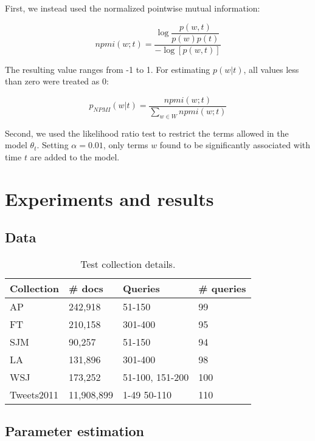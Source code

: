 \documentclass{sig-alternate}
\begin{document}
First, we instead used the normalized pointwise mutual information:

\[
npmi(w;t) = \dfrac{\log \dfrac{p(w,t)}{p(w)p(t)}}{-\log[p(w,t)]}
\]

The resulting value ranges from -1 to 1. For estimating $p(w \vert t)$, all values less than zero were treated as 0:

\[
p_{NPMI} (w \vert t) = \dfrac{npmi(w;t)}{\sum_{w \in W} npmi(w; t)}
\]

Second, we used the likelihood ratio test to restrict the terms allowed in the model $\theta_t$. Setting $\alpha=0.01$, 
only terms $w$ found to be significantly associated with time $t$ are added to the model.

\section{Experiments and results}
\subsection{Data}

\begin{table}[htdp]
\small
\caption{Test collection details.  }
\begin{center}
\tabcolsep=0.11cm
\begin{tabular}{| l | l | l | l | }
\hline
\bf{Collection} & \bf{\# docs}  & \bf{Queries} & \bf{\# queries} \\ \hline
AP & 242,918 & 51-150 & 99 \\ \hline
FT & 210,158 & 301-400 & 95 \\ \hline
SJM & 90,257 & 51-150 & 94 \\ \hline
LA & 131,896 & 301-400 & 98 \\ \hline
WSJ & 173,252 & 51-100, 151-200 & 100 \\ \hline
Tweets2011 & 11,908,899 & 1-49  50-110  & 110\\ \hline
\end{tabular}
\end{center}
\label{table.results}
\normalsize
\end{table}

\subsection{Parameter estimation}
\end{document}

